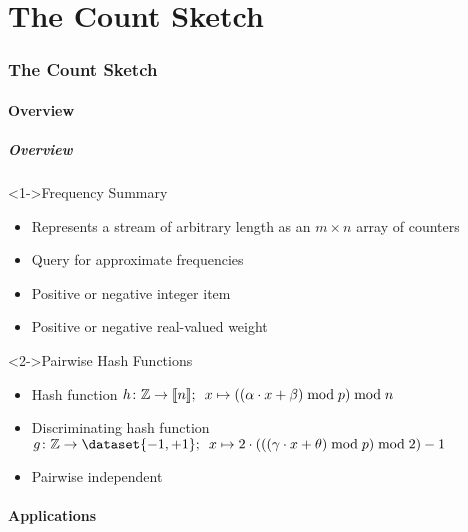 \part{The Count Sketch}

\section{The Count Sketch}

\subsection{Overview}

\begin{frame}
  \frametitle{Overview}

  \begin{block}<1->{Frequency Summary}
    \begin{itemize}
      \item Represents a stream of arbitrary length as an \( m \times n \) array of counters
      \item Query for approximate frequencies
      \item Positive or negative integer item
      \item Positive or negative real-valued weight
    \end{itemize}
  \end{block}

  \begin{block}<2->{Pairwise Hash Functions}
    \begin{itemize}
      \item Hash function \( h \colon \mathbb{Z} \to \llbracket n\rrbracket; \enspace x \mapsto ((\alpha \cdot x + \beta) \bmod p) \bmod n \)
      \item Discriminating hash function \( g \colon \integers \to \dataset{-1, +1}; \enspace x \mapsto 2 \cdot (((\gamma \cdot x + \theta) \bmod p) \bmod 2) - 1 \)
      \item Pairwise independent
    \end{itemize}
  \end{block}
\end{frame}

\subsection{Applications}


